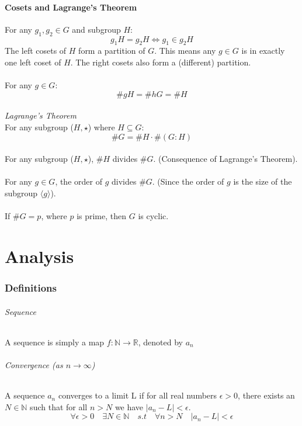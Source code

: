 \documentclass{article}
\newcommand{\R}{\mathbb{R}}
\newcommand{\N}{\mathbb{N}}
\begin{document}
\subsection{Cosets and Lagrange's Theorem}
For any $ g_{1}, g_{2} \in G $ and subgroup $ H $:
\begin{equation}
g_{1}H = g_{2}H \Leftrightarrow g_{1} \in g_{2}H
\end{equation}
The left cosets of $ H $ form a partition of $ G $. This means any $ g \in G $ is in exactly one left coset of $ H $. The right cosets also form a (different) partition.
\\\\
For any $ g \in G $:
\begin{equation}
\#gH = \#hG = \#H
\end{equation}
\\
\textit{Lagrange's Theorem}
\\
For any subgroup ($ H, \star $) where $ H \subseteq G $:
\begin{equation}
\#G = \#H \cdot \#(G : H)
\end{equation}
\\
For any subgroup ($ H, \star $), $ \#H $ divides $ \#G $. (Consequence of Lagrange's Theorem).
\\\\
For any $ g \in G $, the order of $ g $ divides $ \#G $. (Since the order of $ g $ is the size of the subgroup $ \langle g \rangle $).
\\\\
If $ \#G = p $, where $ p $ is prime, then $ G $ is cyclic.

\newpage
\part{Analysis}

\section{Definitions}
\paragraph{Sequence}
A sequence is simply a map $ f: \N \to \R $, denoted by $ a_{n} $
\paragraph{Convergence (as $ n \to \infty $)}
A sequence $ a_{n} $ converges to a limit L if for all real numbers $ \epsilon > 0 $, there exists an $ N \in \N $ such that for all $ n > N $ we have $ |a_{n} - L| < \epsilon $.
\begin{equation}
\forall \epsilon > 0 \quad \exists N \in \N \quad s.t \quad \forall n > N \quad |a_{n} - L| < \epsilon
\end{equation}
\end{document}
